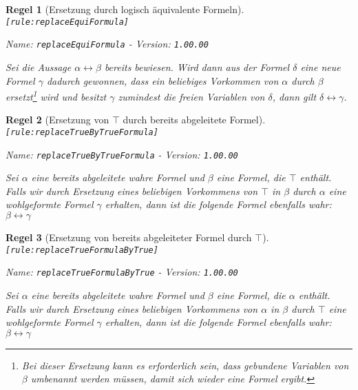 \documentclass[a4paper,german,10pt,twoside]{book}
\newtheorem{rul}{Regel}
\theoremstyle{definition}
\theoremstyle{remark}
\begin{document}
\begin{rul}[Ersetzung durch logisch {\"a}quivalente Formeln]
\label{rule:replaceEquiFormula} \hypertarget{rule:replaceEquiFormula}{}
{\tt \tiny [\verb]rule:replaceEquiFormula]]}

\par
{\em   Name: \verb]replaceEquiFormula]  -  Version: \verb]1.00.00]}


Sei die Aussage $\alpha \leftrightarrow \beta$ bereits bewiesen. Wird dann aus der Formel $\delta$ eine neue Formel $\gamma$ dadurch gewonnen, dass ein beliebiges Vorkommen von $\alpha$ durch $\beta$ ersetzt\footnote{Bei dieser Ersetzung kann es erforderlich sein, dass gebundene Variablen von $\beta$ umbenannt werden m{\"u}ssen, damit sich wieder eine Formel ergibt.} wird und besitzt $\gamma$ zumindest die freien Variablen von $\delta$, dann gilt $\delta \leftrightarrow \gamma$.
\end{rul}


\begin{rul}[Ersetzung von $\top$ durch bereits abgeleitete Formel]
\label{rule:replaceTrueByTrueFormula} \hypertarget{rule:replaceTrueByTrueFormula}{}
{\tt \tiny [\verb]rule:replaceTrueByTrueFormula]]}

\par
{\em   Name: \verb]replaceTrueByTrueFormula]  -  Version: \verb]1.00.00]}


Sei $\alpha$ eine bereits abgeleitete wahre Formel und $\beta$ eine Formel, die $\top$ enth{\"a}lt. Falls wir durch Ersetzung eines beliebigen Vorkommens von $\top$ in $\beta$ durch $\alpha$ eine wohlgeformte Formel $\gamma$ erhalten, dann ist die folgende Formel ebenfalls wahr: $\beta \leftrightarrow \gamma$
\end{rul}


\begin{rul}[Ersetzung von bereits abgeleiteter Formel durch $\top$]
\label{rule:replaceTrueFormulaByTrue} \hypertarget{rule:replaceTrueFormulaByTrue}{}
{\tt \tiny [\verb]rule:replaceTrueFormulaByTrue]]}

\par
{\em   Name: \verb]replaceTrueFormulaByTrue]  -  Version: \verb]1.00.00]}


Sei $\alpha$ eine bereits abgeleitete wahre Formel und $\beta$ eine Formel, die $\alpha$ enth{\"a}lt. Falls wir durch Ersetzung eines beliebigen Vorkommens von $\alpha$ in $\beta$ durch $\top$ eine wohlgeformte Formel $\gamma$ erhalten, dann ist die folgende Formel ebenfalls wahr: $\beta \leftrightarrow \gamma$
\end{rul}
\end{document}
